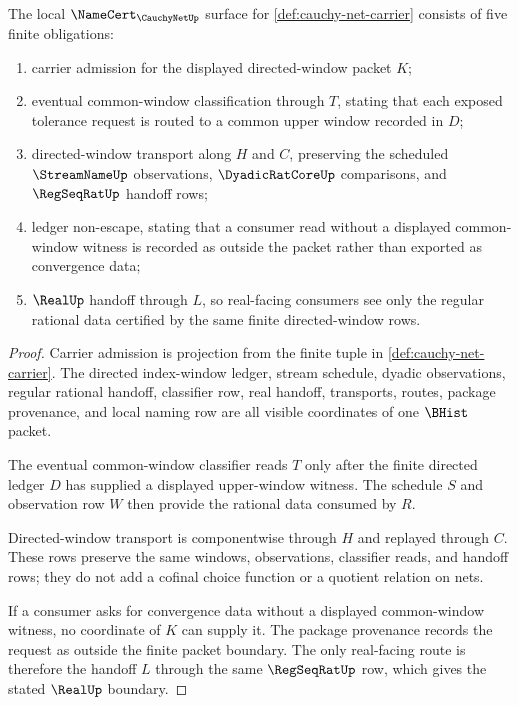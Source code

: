 \begin{theorem}
\label{thm:cauchy-net-namecert-obligation-surface}
The local $\NameCert_{\CauchyNetUp}$ surface for \autoref{def:cauchy-net-carrier} consists of five finite obligations:
\begin{enumerate}
\item carrier admission for the displayed directed-window packet $K$;
\item eventual common-window classification through $T$, stating that each exposed tolerance request is routed to a common upper window recorded in $D$;
\item directed-window transport along $H$ and $C$, preserving the scheduled $\StreamNameUp$ observations, $\DyadicRatCoreUp$ comparisons, and $\RegSeqRatUp$ handoff rows;
\item ledger non-escape, stating that a consumer read without a displayed common-window witness is recorded as outside the packet rather than exported as convergence data;
\item $\RealUp$ handoff through $L$, so real-facing consumers see only the regular rational data certified by the same finite directed-window rows.
\end{enumerate}
\end{theorem}
\begin{proof}
Carrier admission is projection from the finite tuple in \autoref{def:cauchy-net-carrier}. The directed index-window ledger, stream schedule, dyadic observations, regular rational handoff, classifier row, real handoff, transports, routes, package provenance, and local naming row are all visible coordinates of one $\BHist$ packet.

The eventual common-window classifier reads $T$ only after the finite directed ledger $D$ has supplied a displayed upper-window witness. The schedule $S$ and observation row $W$ then provide the rational data consumed by $R$.

Directed-window transport is componentwise through $H$ and replayed through $C$. These rows preserve the same windows, observations, classifier reads, and handoff rows; they do not add a cofinal choice function or a quotient relation on nets.

If a consumer asks for convergence data without a displayed common-window witness, no coordinate of $K$ can supply it. The package provenance records the request as outside the finite packet boundary. The only real-facing route is therefore the handoff $L$ through the same $\RegSeqRatUp$ row, which gives the stated $\RealUp$ boundary.
\end{proof}

